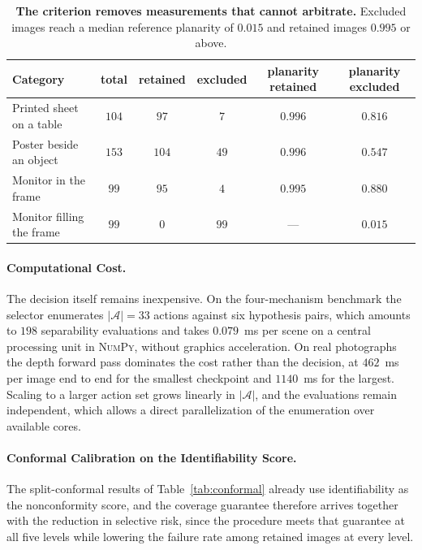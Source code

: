 \documentclass{article} %
\theoremstyle{defstyle}
\theoremstyle{plain}
\begin{document}
\begin{table}[!ht]
\caption{\textbf{The criterion removes measurements that cannot arbitrate.} Excluded images reach a
median reference planarity of $0.015$ and retained images $0.995$ or above.}
\label{tab:supp-category-exclusion}
\begin{center}
\footnotesize
\begin{tabular}{lccccc}
\toprule
\textbf{Category} & \textbf{total} & \textbf{retained} & \textbf{excluded} &
\textbf{planarity retained} & \textbf{planarity excluded} \\
\midrule
Printed sheet on a table  & $104$ & $97$  & $7$   & $0.996$ & $0.816$ \\
Poster beside an object   & $153$ & $104$ & $49$  & $0.996$ & $0.547$ \\
Monitor in the frame      & $99$  & $95$  & $4$   & $0.995$ & $0.880$ \\
Monitor filling the frame & $99$  & $0$   & $99$  & --- & $\mathbf{0.015}$ \\
\bottomrule
\end{tabular}
\end{center}
\end{table}

\paragraph{Computational Cost.}
The decision itself remains inexpensive. On the four-mechanism benchmark the selector
enumerates $|\mathcal{A}| = 33$ actions against six hypothesis pairs, which amounts to $198$
separability evaluations and takes $0.079$~ms per scene on a central processing unit in
\textsc{NumPy}, without graphics acceleration. On real photographs the depth forward pass
dominates the cost rather than the decision, at $462$~ms per image end to end for the
smallest checkpoint and $1140$~ms for the largest. Scaling to a larger action set grows linearly
in $|\mathcal{A}|$, and the evaluations remain independent, which allows a direct
parallelization of the enumeration over available cores.

\paragraph{Conformal Calibration on the Identifiability Score.}
The split-conformal results of Table~\ref{tab:conformal} already use identifiability as the
nonconformity score, and the coverage guarantee therefore arrives together with the
reduction in selective risk, since the procedure meets that guarantee at all five levels
while lowering the failure rate among retained images at every level.
\end{document}
